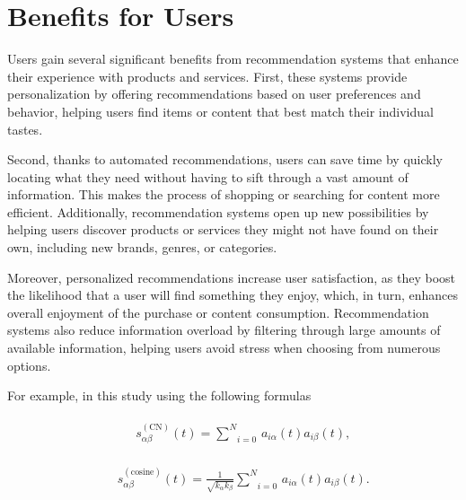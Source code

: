 \documentclass[10pt,twoside,slovak,a4paper]{article}
\begin{document}
\newpage
\section{Benefits for Users} \label{Benefits for Users}
Users gain several significant benefits from recommendation systems that enhance their experience with products and services\cite{user}. First, these systems provide personalization by offering recommendations based on user preferences and behavior, helping users find items or content that best match their individual tastes.

Second, thanks to automated recommendations, users can save time by quickly locating what they need without having to sift through a vast amount of information. This makes the process of shopping or searching for content more efficient. Additionally, recommendation systems open up new possibilities by helping users discover products or services they might not have found on their own, including new brands, genres, or categories.


Moreover, personalized recommendations increase user satisfaction, as they boost the likelihood that a user will find something they enjoy, which, in turn, enhances overall enjoyment of the purchase or content consumption. Recommendation systems also reduce information overload by filtering through large amounts of available information, helping users avoid stress when choosing from numerous options.

For example, in this study \cite{closeness}using the following formulas

\begin{eqnarray}
    &&\begin{array}{*{35}{l}}
        s_{\alpha \beta}^{\left(\text{CN}\right)}(t)=\underset{i=0}{\overset{N}{\sum}}\,{{a}_{i\alpha}}(t){{a}_{i\beta}}(t), 
    \end{array}
\end{eqnarray}

\begin{eqnarray}
    &&\begin{array}{*{35}{l}}
        s_{\alpha \beta}^{\left(\text{cosine}\right)}(t)=\frac{1}{\sqrt{{{k}_{\alpha}}{{k}_{\beta}}}}\underset{i=0}{\overset{N}{\sum}}\,{{a}_{i\alpha}}(t){{a}_{i\beta}}(t). 
    \end{array}
\end{eqnarray}
\end{document}
